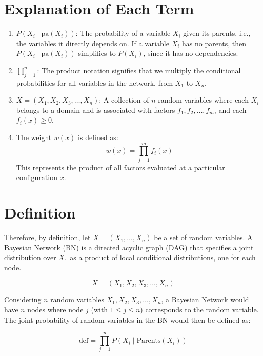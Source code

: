 \section*{Explanation of Each Term}

\begin{enumerate}
    \item \( P(X_i \mid \text{pa}(X_i)) \): The probability of a variable \( X_i \) given its parents, i.e., the variables it directly depends on. If a variable \( X_i \) has no parents, then \( P(X_i \mid \text{pa}(X_i)) \) simplifies to \( P(X_i) \), since it has no dependencies.

    \item \( \prod_{j=1}^{n} \): The product notation signifies that we multiply the conditional probabilities for all variables in the network, from \( X_1 \) to \( X_n \).

    \item \( X = (X_1, X_2, X_3, \ldots, X_n) \): A collection of \( n \) random variables where each \( X_i \) belongs to a domain and is associated with factors \( f_1, f_2, \ldots, f_m \), and each \( f_i(x) \geq 0 \).

    \item The weight \( w(x) \) is defined as:
    \begin{equation}
    w(x) = \prod_{j=1}^{m} f_i(x)
    \end{equation}
    This represents the product of all factors evaluated at a particular configuration \( x \).
\end{enumerate}

\section*{Definition}

Therefore, by definition, let \( X = (X_1, \ldots, X_n) \) be a set of random variables. A Bayesian Network (BN) is a directed acyclic graph (DAG) that specifies a joint distribution over \( X_1 \) as a product of local conditional distributions, one for each node. 

\[
X = (X_1, X_2, X_3, \ldots, X_n)
\]

Considering \( n \) random variables \( X_1, X_2, X_3, \ldots, X_n \), a Bayesian Network would have \( n \) nodes where node \( j \) (with \( 1 \leq j \leq n \)) corresponds to the random variable. The joint probability of random variables in the BN would then be defined as:

\begin{equation}
\text{def} = \prod_{j=1}^{n} P(X_i \mid \text{Parents}(X_i))
\end{equation}

